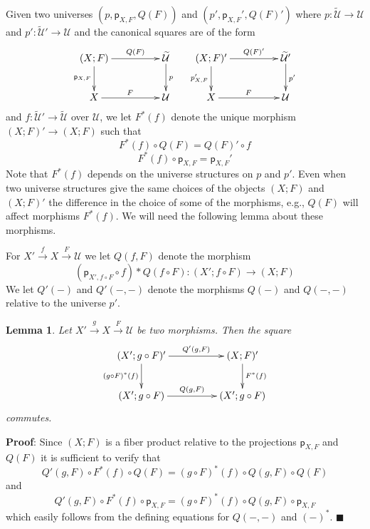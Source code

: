 \documentclass[12pt]{article}
\numberwithin{equation}{section}
\newenvironment{eq}{\begin{equation}}{\end{equation}}
\newenvironment{myproof}{{\bf Proof}:}{$\blacksquare$ \vskip 5mm }
\newtheorem{lemma}[proposition]{Lemma}
\newcommand{\llabel}[1]{\label{#1}}
\newcommand{\sr}{\rightarrow}
\newcommand{\wt}{\widetilde}
\newcommand{\spc}{{\,\,\,\,\,\,\,}}
\newcommand{\p}{\mathsf{p}}
\newcommand{\U}{\mathcal{U}}
\begin{document}
Given two universes $(p,\p_{X,F},Q(F))$ and $(p',\p_{X,F}',Q(F)')$ where
$p:\wt{\U}\sr \U$ and $p':\wt{\U}'\sr \U$ and the canonical squares are of the form
%
$$
\begin{xy}
          \xymatrix@C=4pc{ (X;F) \ar[r]^-{Q(F)} \ar[d]_{\p_{X,F}} & \wt{\U}
            \ar[d]^{p}\\ X \ar[r]^{F} & \U }
\end{xy}
\spc
\begin{xy}
          \xymatrix@C=4pc{ (X;F)' \ar[r]^-{Q(F)'} \ar[d]_{p'_{X,F}} & \wt{\U}'
            \ar[d]^{p'}\\ X \ar[r]^{F} & \U }
\end{xy}
$$
%
and $f:\wt{\U}'\sr \wt{\U}$ over $\U$, we let $F^*(f)$ denote the unique morphism
$(X;F)'\sr (X;F)$ such that
%
\begin{eq}\llabel{2015.04.08.eq3}
F^*(f)\circ Q(F)=Q(F)'\circ f
\end{eq}
%
\begin{eq}\llabel{2015.04.08.eq4}
F^*(f)\circ \p_{X,F}=\p_{X,F}'
\end{eq}
%
Note that $F^*(f)$ depends on the universe structures on $p$ and $p'$. Even
when two universe structures give the same choices of the objects $(X;F)$ and
$(X;F)'$ the difference in the choice of some of the morphisms, e.g., $Q(F)$
will affect morphisms $F^*(f)$. We will need the following lemma about these
morphisms.

For $X'\stackrel{f}{\sr}X \stackrel{F}{\sr}\U$ we let $Q(f,F)$ denote the
morphism
%
$$(\p_{X',f\circ F}\circ f)*Q(f\circ F):(X';f\circ F)\sr (X;F)$$
%
We let $Q'(-)$ and $Q'(-,-)$ denote the morphisms $Q(-)$ and $Q(-,-)$ relative
to the universe $p'$.
%
\begin{lemma}
\llabel{2015.04.20.l1} Let $X'\stackrel{g}{\sr}X\stackrel{F}{\sr}\U$ be two
morphisms. Then the square
%
$$
\begin{xy}
          \xymatrix@C=4pc{ (X';g\circ F)' \ar[r]^-{Q'(g,F)} \ar[d]_{(g\circ
              F)^*(f)} & (X;F)' \ar[d]^{F^*(f)}\\ (X';g\circ F) \ar[r]^{Q(g,F)}
            & (X';g\circ F) }
\end{xy}
$$
%
commutes.
%
\end{lemma}
%
\begin{myproof}
Since $(X;F)$ is a fiber product relative to the projections $\p_{X,F}$ and
$Q(F)$ it is sufficient to verify that
%
$$Q'(g,F)\circ F^*(f)\circ Q(F)=(g\circ F)^*(f) \circ Q(g,F)\circ Q(F)$$
%
and
%
$$Q'(g,F)\circ F^*(f)\circ \p_{X,F}=(g\circ F)^*(f) \circ Q(g,F)\circ \p_{X,F}$$
%
which easily follows from the defining equations for $Q(-,-)$ and $(-)^*$.
\end{myproof}
\end{document}
